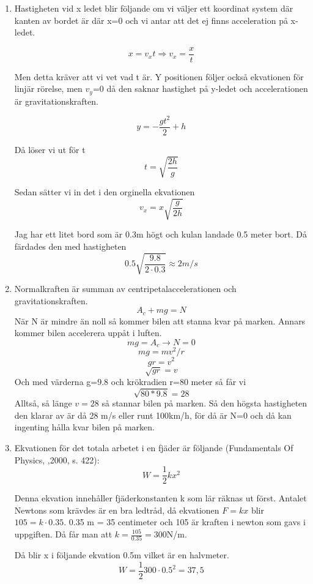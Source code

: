 \documentclass[a4paper,12pt]{article}
\begin{document}
\begin{enumerate}
    \item Hastigheten vid x ledet blir följande om vi väljer ett 
    koordinat system där kanten av bordet är där x=0 och vi antar att 
    det ej finns acceleration på x-ledet.

    $$x=v_xt\Rightarrow v_x=\frac{x}{t}$$
    
    Men detta kräver att vi vet vad t är.
    Y positionen följer också ekvationen för linjär rörelse, men 
    $v_{y}$=0 då den saknar hastighet på y-ledet och accelerationen
    är gravitationskraften.

    $$y=-\frac{gt^2}{2}+h$$

    Då löser vi ut för t
    $$t=\sqrt{\frac{2h}{g}}$$

    Sedan sätter vi in det i den orginella ekvationen
    $$v_x=x\sqrt{\frac{g}{2h}}$$

    Jag har ett litet bord som är 0.3m högt och kulan landade 0.5 meter bort. 
    Då färdades den med hastigheten 
    $$0.5\sqrt{\frac{9.8}{2\cdot 0.3}}\approx 2 m/s$$

    \item Normalkraften är summan av centripetalaccelerationen och gravitationskraften.
          $$A_c+mg=N$$
          När N är mindre än noll så kommer bilen att stanna kvar på marken. Annars
          kommer bilen accelerera uppåt i luften.
          $$mg=A_c\rightarrow N=0$$
          $$mg=mv^2/r$$
          $$gr=v^2$$
          $$\sqrt{gr}=v$$
          Och med värderna g=9.8 och krökradien r=80 meter så får vi
          $$\sqrt{80*9.8}=28$$
          Alltså, så länge $v=28$ så stannar bilen på marken. Så den högsta
          hastigheten den klarar av är då 28 m/s eller runt 100km/h, för då är N=0
          och då kan ingenting hålla kvar bilen på marken.

    \item Ekvationen för det totala arbetet i en fjäder är följande (Fundamentals Of Physics, ,2000, s. 422):
    $$W=\frac{1}{2}kx^2$$
    
    Denna ekvation innehåller fjäderkonstanten k som lär räknas ut först.
    Antalet Newtons som krävdes är en bra ledtråd, då ekvationen $F=kx$ 
    blir $105=k\cdot 0.35$. 0.35 m = 35 centimeter och 105 är kraften i newton som 
    gavs i uppgiften. Då får man att $k=\frac{105}{0.35}=300$N/m.

    Då blir x i följande ekvation 0.5m vilket är en halvmeter. 
    $$W=\frac{1}{2}300\cdot 0.5^2=37,5$$


\end{enumerate}
\end{document}
